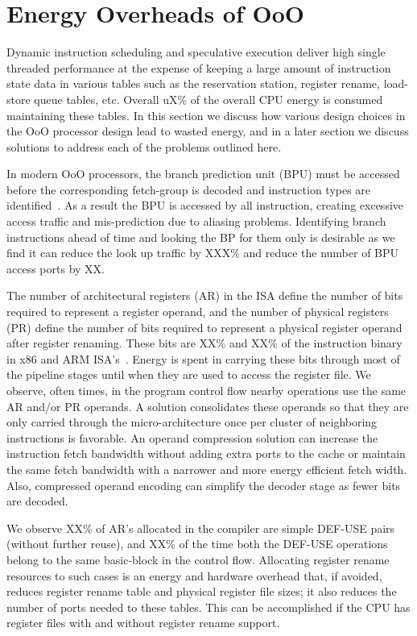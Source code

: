 \section{Energy Overheads of OoO}
\label{sec:o3_overhead}

Dynamic instruction scheduling and speculative execution deliver high single
threaded performance at the expense of keeping a large amount of instruction
state data in various tables such as the reservation station, register rename,
      load-store queue tables, etc. Overall uX\% of the overall CPU energy is
      consumed maintaining these tables. In this section we discuss how various
      design choices in the OoO processor design lead to wasted energy, and in a
      later section we discuss solutions to address each of the problems
      outlined here.

In modern OoO processors, the branch prediction unit (BPU) must be accessed
before the corresponding fetch-group is decoded and instruction types are
identified~\cite{ref:EV8}. As a result the BPU is accessed by all instruction,
    creating excessive access traffic and mis-prediction due to aliasing
    problems. Identifying branch instructions ahead of time and looking the BP
    for them only is desirable as we find it can reduce the look up traffic by
    XXX\% and reduce the number of BPU access ports by XX.

The number of architectural registers (AR) in the ISA define the number of bits
required to represent a register operand, and the number of physical registers
(PR) define the number of bits required to represent a physical register operand
after register renaming. These bits are XX\% and XX\% of the instruction binary
in x86 and ARM ISA's~\cite{}. Energy is spent in carrying these bits through
most of the pipeline stages until when they are used to access the register
file. We observe, often times, in the program control flow nearby operations use
the same AR and/or PR operands. A solution consolidates these operands so that
they are only carried through the micro-architecture once per cluster of
neighboring instructions is favorable. An operand compression solution can
increase the instruction fetch bandwidth without adding extra ports to the cache
or maintain the same fetch bandwidth with a narrower and more energy efficient
fetch width. Also, compressed operand encoding can simplify the decoder stage as
fewer bits are decoded.

We observe XX\% of AR's allocated in the compiler are simple DEF-USE pairs
(without further reuse), and XX\% of the time both the DEF-USE operations belong
to the same basic-block in the control flow. Allocating register rename
resources to such cases is an energy and hardware overhead that, if avoided,
          reduces register rename table and physical register file sizes; it
          also reduces the number of ports needed to these tables. This can be
          accomplished if the CPU has register files with and without register
          rename support.

